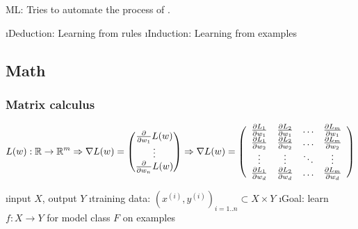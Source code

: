 
ML: Tries to automate the process of .

\be
\i Deduction: Learning from rules
\i Induction: Learning from examples
\ee

\subsection{Math}


\subsubsection{Matrix calculus}

\newcommand{\dlw}[2]{\frac{\partial L_#1}{\partial w_#2}}
\begin{align*}
L(w): \RS \to \RS^m
\Rightarrow  \nabla L(w) = \vct{\drv{w_1}L(w)\\\vdots\\\drv{w_n}L(w)}
\Rightarrow \nabla L(w) = \left(\begin{array}{cccc}
\dlw{1}{1} & \dlw{2}{1} & \ldots & \dlw{m}{1} \\
\dlw{1}{2} & \dlw{2}{2} & \ldots & \dlw{m}{2} \\
\vdots & \vdots & \ddots & \vdots \\
\dlw{1}{d} & \dlw{2}{d} & \ldots & \dlw{m}{d}
\end{array}\right)
\end{align*}


\bi
\i input $X$, output $Y$
\i training data: $(x^{(i)}, y^{(i)})_{i=1..n} \subset X \times Y$
\i Goal: learn $f: X \to Y$ for model class $F$ on examples
\ei

